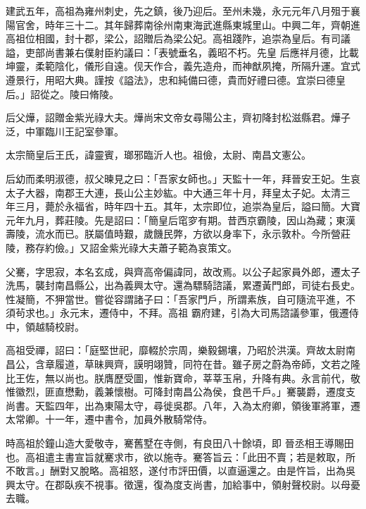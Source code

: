 \begin{pinyinscope}
 建武五年，高祖為雍州刺史，先之鎮，後乃迎后。至州未幾，永元元年八月殂于襄陽官舍，時年三十二。其年歸葬南徐州南東海武進縣東城里山。中興二年，齊朝進高祖位相國，封十郡，梁公，詔贈后為梁公妃。高祖踐阼，追崇為皇后。有司議謚，吏部尚書兼右僕射臣約議曰：「表號垂名，義昭不朽。先皇
 后應祥月德，比載坤靈，柔範陰化，儀形自遠。伣天作合，義先造舟，而神猷夙掩，所隔升運。宜式遵景行，用昭大典。謹按《謚法》，忠和純備曰德，貴而好禮曰德。宜崇曰德皇后。」詔從之。陵曰脩陵。



 后父燁，詔贈金紫光祿大夫。燁尚宋文帝女尋陽公主，齊初降封松滋縣君。燁子泛，中軍臨川王記室參軍。



 太宗簡皇后王氏，諱靈賓，瑯邪臨沂人也。祖儉，太尉、南昌文憲公。



 后幼而柔明淑德，叔父暕見之曰：「吾家女師也。」天監十一年，拜晉安王妃。生哀太子大器，南郡王大連，長山公主妙紘。中大通三年十月，拜皇太子妃。太清三
 年三月，薨於永福省，時年四十五。其年，太宗即位，追崇為皇后，謚曰簡。大寶元年九月，葬莊陵。先是詔曰：「簡皇后窀穸有期。昔西京霸陵，因山為藏；東漢壽陵，流水而已。朕屬值時艱，歲饑民弊，方欲以身率下，永示敦朴。今所營莊陵，務存約儉。」又詔金紫光祿大夫蕭子範為哀策文。



 父騫，字思寂，本名玄成，與齊高帝偏諱同，故改焉。以公子起家員外郎，遷太子洗馬，襲封南昌縣公，出為義興太守。還為驃騎諮議，累遷黃門郎，司徒右長史。性凝簡，不狎當世。嘗從容謂諸子曰：「吾家門戶，所謂素族，自可隨流平進，不須茍求也。」永元末，遷侍中，不拜。高祖
 霸府建，引為大司馬諮議參軍，俄遷侍中，領越騎校尉。



 高祖受禪，詔曰：「庭堅世祀，靡輟於宗周，樂毅錫壤，乃昭於洪漢。齊故太尉南昌公，含章履道，草昧興齊，謨明翊贊，同符在昔。雖子房之蔚為帝師，文若之隆比王佐，無以尚也。朕膺歷受圖，惟新寶命，莘莘玉帛，升降有典。永言前代，敬惟徽烈，匪直懋勳，義兼懷樹。可降封南昌公為侯，食邑千戶。」騫襲爵，遷度支尚書。天監四年，出為東陽太守，尋徙吳郡。八年，入為太府卿，領後軍將軍，遷太常卿。十一年，遷中書令，加員外散騎常侍。



 時高祖於鐘山造大愛敬寺，騫舊墅在寺側，有良田八十餘頃，即
 晉丞相王導賜田也。高祖遣主書宣旨就騫求市，欲以施寺。騫答旨云：「此田不賣；若是敕取，所不敢言。」酬對又脫略。高祖怒，遂付市評田價，以直逼還之。由是忤旨，出為吳興太守。在郡臥疾不視事。徵還，復為度支尚書，加給事中，領射聲校尉。以母憂去職。




\end{pinyinscope}
